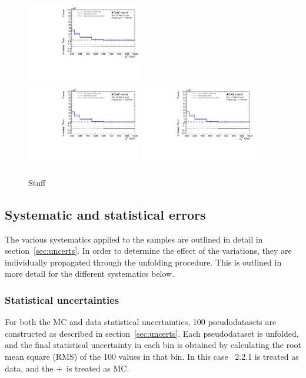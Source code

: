 \begin{figure}[h!]
  \includegraphics[page=651,width=0.45\textwidth]{figures/IBUClosureTests.pdf} \\
  \includegraphics[page=615,width=0.45\textwidth]{figures/IBUClosureTests.pdf}
  \includegraphics[page=657,width=0.45\textwidth]{figures/IBUClosureTests.pdf}
  \caption{Stuff}
  \label{fig:DDTestTJ2}
\end{figure}

\clearpage

\subsection{Systematic and statistical errors}
The various systematics applied to the samples are outlined in detail in section~\ref{sec:uncerts}. In order to determine the effect of the variations, they are individually propagated through the unfolding procedure. This is outlined in more detail for the different systematics below.
\subsubsection{Statistical uncertainties}
For both the MC and data statistical uncertainties, 100 pseudodatasets are constructed as described in section~\ref{sec:uncerts}. Each pseudodataset is unfolded, and the final statistical uncertainty in each bin is obtained by calculating the root mean square (RMS) of the 100 values in that bin. In this case \sherpa~2.2.1 is treated as data, and the \powheg+\pythia~is treated as MC.


